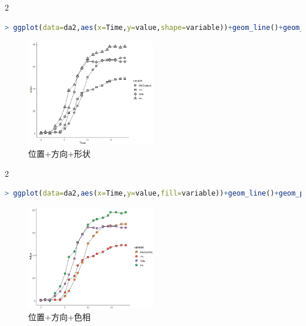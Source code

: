 \documentclass[11pt,a4paper,oneside]{book}
\begin{document}
\begin{multicols}{2}
\begin{lstlisting}[language=r]
> ggplot(data=da2,aes(x=Time,y=value,shape=variable))+geom_line()+geom_point(size=4,color="black",fill="grey60")+scale_shape_manual(values = c(21,22,23,24))+theme_classic()
\end{lstlisting}
\begin{figure}[H]
	\centering
	\includegraphics[width=0.5\textwidth]{screenshot027}
	\caption{位置+方向+形状}
	\label{fig:screenshot027}
\end{figure}
\end{multicols}
\begin{multicols}{2}
\begin{lstlisting}[language=r]
> ggplot(data=da2,aes(x=Time,y=value,fill=variable))+geom_line()+geom_point(shape=21,size=4,color="black")+scale_fill_manual(values = c("#FF9641","#FF5B4E","#B887C3","#38C25D"))+theme_classic()
\end{lstlisting}
\begin{figure}[H]
	\centering
	\includegraphics[width=0.5\textwidth]{screenshot028}
	\caption{位置+方向+色相}
	\label{fig:screenshot028}
\end{figure}
\end{multicols}
\end{document}
